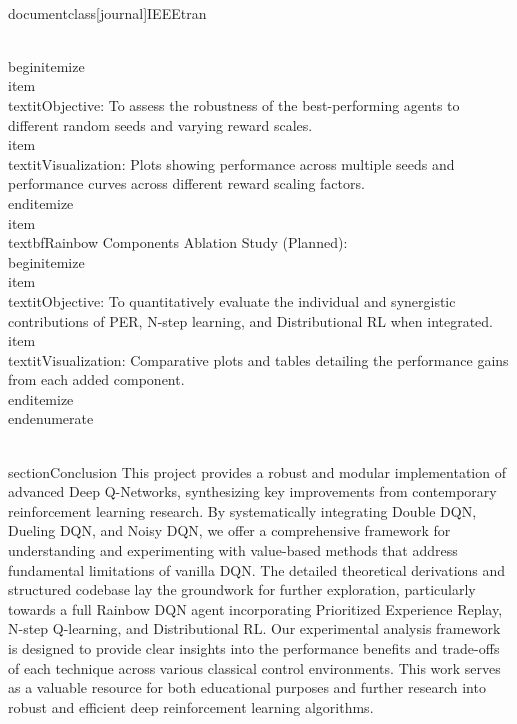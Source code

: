 \\documentclass[journal]{IEEEtran}
\begin{document}
    \\begin{itemize}
        \\item \\textit{Objective}: To assess the robustness of the best-performing agents to different random seeds and varying reward scales.
        \\item \\textit{Visualization}: Plots showing performance across multiple seeds and performance curves across different reward scaling factors.
    \\end{itemize}
    \\item \\textbf{Rainbow Components Ablation Study (Planned)}:
    \\begin{itemize}
        \\item \\textit{Objective}: To quantitatively evaluate the individual and synergistic contributions of PER, N-step learning, and Distributional RL when integrated.
        \\item \\textit{Visualization}: Comparative plots and tables detailing the performance gains from each added component.
    \\end{itemize}
\\end{enumerate}

\\section{Conclusion}
This project provides a robust and modular implementation of advanced Deep Q-Networks, synthesizing key improvements from contemporary reinforcement learning research. By systematically integrating Double DQN, Dueling DQN, and Noisy DQN, we offer a comprehensive framework for understanding and experimenting with value-based methods that address fundamental limitations of vanilla DQN. The detailed theoretical derivations and structured codebase lay the groundwork for further exploration, particularly towards a full Rainbow DQN agent incorporating Prioritized Experience Replay, N-step Q-learning, and Distributional RL. Our experimental analysis framework is designed to provide clear insights into the performance benefits and trade-offs of each technique across various classical control environments. This work serves as a valuable resource for both educational purposes and further research into robust and efficient deep reinforcement learning algorithms.
\end{document}
